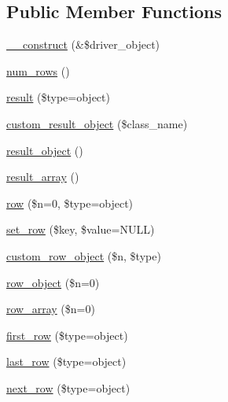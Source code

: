 \subsection*{Public Member Functions}
\begin{DoxyCompactItemize}
\item 
\mbox{\hyperlink{class_c_i___d_b__result_a402837467122c8953ae195a05f64aebd}{\+\_\+\+\_\+construct}} (\&\$driver\+\_\+object)
\item 
\mbox{\hyperlink{class_c_i___d_b__result_ae2c1d61b95abfa23fa5df84f62d324d3}{num\+\_\+rows}} ()
\item 
\mbox{\hyperlink{class_c_i___d_b__result_ab39e89e480cec1f13fc4045a3c46ddb8}{result}} (\$type=\textquotesingle{}object\textquotesingle{})
\item 
\mbox{\hyperlink{class_c_i___d_b__result_afe0af27f3ea920d51d39b471230bba53}{custom\+\_\+result\+\_\+object}} (\$class\+\_\+name)
\item 
\mbox{\hyperlink{class_c_i___d_b__result_a013df0c7514463e2f375c23c7f017f1b}{result\+\_\+object}} ()
\item 
\mbox{\hyperlink{class_c_i___d_b__result_a84f298e436eca13c753008c23aeff565}{result\+\_\+array}} ()
\item 
\mbox{\hyperlink{class_c_i___d_b__result_a09336481a6724699a8a7d36de478f0c1}{row}} (\$n=0, \$type=\textquotesingle{}object\textquotesingle{})
\item 
\mbox{\hyperlink{class_c_i___d_b__result_a4bef6ee465f69e62ee84cb1b9186219f}{set\+\_\+row}} (\$key, \$value=N\+U\+LL)
\item 
\mbox{\hyperlink{class_c_i___d_b__result_ad116f32ad04c599a69292d57a44ba224}{custom\+\_\+row\+\_\+object}} (\$n, \$type)
\item 
\mbox{\hyperlink{class_c_i___d_b__result_a28b3aef630f4ce3ea9c6c0cca6139d4a}{row\+\_\+object}} (\$n=0)
\item 
\mbox{\hyperlink{class_c_i___d_b__result_ae5f9b2f3a488644c751d0b853f506323}{row\+\_\+array}} (\$n=0)
\item 
\mbox{\hyperlink{class_c_i___d_b__result_ab416a868422b74af51d500b63b3e59f7}{first\+\_\+row}} (\$type=\textquotesingle{}object\textquotesingle{})
\item 
\mbox{\hyperlink{class_c_i___d_b__result_ae008a8382dc6171e536870d79c1995ec}{last\+\_\+row}} (\$type=\textquotesingle{}object\textquotesingle{})
\item 
\mbox{\hyperlink{class_c_i___d_b__result_aa2c850190bed89ee860ea73caca7937d}{next\+\_\+row}} (\$type=\textquotesingle{}object\textquotesingle{})

\end{DoxyCompactItemize}
